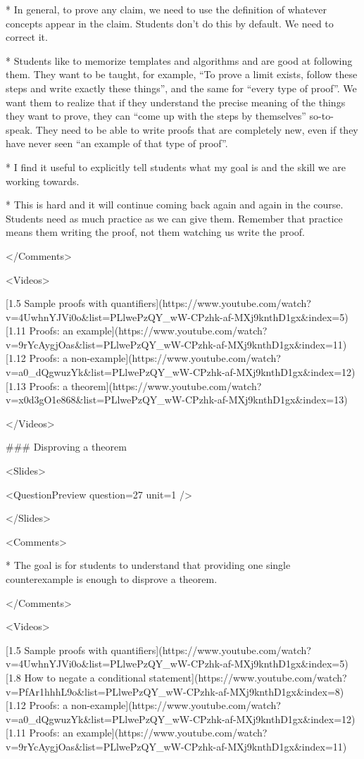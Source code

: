     *   In general, to prove any claim, we need to use the definition of whatever concepts appear in the claim. Students don’t do this by default. We need to correct it.

    *   Students like to memorize templates and algorithms and are good at following them. They want to be taught, for example, “To prove a limit exists, follow these steps and write exactly these things”, and the same for “every type of proof”. We want them to realize that if they understand the precise meaning of the things they want to prove, they can “come up with the steps by themselves” so-to-speak. They need to be able to write proofs that are completely new, even if they have never seen “an example of that type of proof”.

*   I find it useful to explicitly tell students what my goal is and the skill we are working towards.

*   This is hard and it will continue coming back again and again in the course. Students need as much practice as we can give them. Remember that practice means them writing the proof, not them watching us write the proof.

</Comments>

<Videos>

[1.5 Sample proofs with quantifiers](https://www.youtube.com/watch?v=4UwhnYJVi0o\&list=PLlwePzQY_wW-CPzhk-af-MXj9knthD1gx\&index=5)[1.11 Proofs: an example](https://www.youtube.com/watch?v=9rYcAygjOas\&list=PLlwePzQY_wW-CPzhk-af-MXj9knthD1gx\&index=11)[1.12 Proofs: a non-example](https://www.youtube.com/watch?v=a0_dQgwuzYk\&list=PLlwePzQY_wW-CPzhk-af-MXj9knthD1gx\&index=12)[1.13 Proofs: a theorem](https://www.youtube.com/watch?v=x0d3gO1e868\&list=PLlwePzQY_wW-CPzhk-af-MXj9knthD1gx\&index=13)

</Videos>

### Disproving a theorem

<Slides>

<QuestionPreview question={27} unit={1} />

</Slides>

<Comments>

*   The goal is for students to understand that providing one single counterexample is enough to disprove a theorem.

</Comments>

<Videos>

[1.5 Sample proofs with quantifiers](https://www.youtube.com/watch?v=4UwhnYJVi0o\&list=PLlwePzQY_wW-CPzhk-af-MXj9knthD1gx\&index=5)[1.8 How to negate a conditional statement](https://www.youtube.com/watch?v=PfAr1hhhL9o\&list=PLlwePzQY_wW-CPzhk-af-MXj9knthD1gx\&index=8)[1.12 Proofs: a non-example](https://www.youtube.com/watch?v=a0_dQgwuzYk\&list=PLlwePzQY_wW-CPzhk-af-MXj9knthD1gx\&index=12)[1.11 Proofs: an example](https://www.youtube.com/watch?v=9rYcAygjOas\&list=PLlwePzQY_wW-CPzhk-af-MXj9knthD1gx\&index=11)

